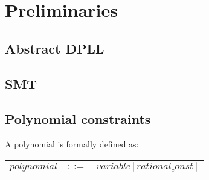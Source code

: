 \chapter{Preliminaries}
\section{Abstract DPLL}
\section{SMT}
\section{Polynomial constraints}
A polynomial is formally defined as:
\begin{table}[h]
\begin{footnotesize}
\begin{tabular}{lll}
$ polynomial $ & $::=$ & $  variable \, | \,  rational_const \, | \, $\\
\end{tabular}
\end{footnotesize}
\end{table}
